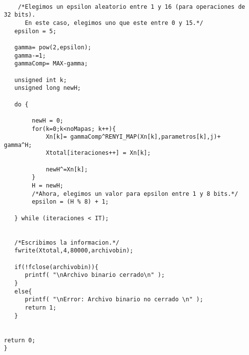 \documentclass[12pt,3p]{elsarticle}
\begin{document}
\begin{verbatim}
 
    /*Elegimos un epsilon aleatorio entre 1 y 16 (para operaciones de 32 bits).
      En este caso, elegimos uno que este entre 0 y 15.*/
   epsilon = 5;   
  
   gamma= pow(2,epsilon);
   gamma-=1;
   gammaComp= MAX-gamma;
    
   unsigned int k;
   unsigned long newH;

   do {
        
        newH = 0;
        for(k=0;k<noMapas; k++){            
            Xn[k]= gammaComp^RENYI_MAP(Xn[k],parametros[k],j)+ gamma^H;
            Xtotal[iteraciones++] = Xn[k];
     
            newH^=Xn[k];      
        }
        H = newH;
        /*Ahora, elegimos un valor para epsilon entre 1 y 8 bits.*/
        epsilon = (H % 8) + 1;  

   } while (iteraciones < IT);
 

   /*Escribimos la informacion.*/
   fwrite(Xtotal,4,80000,archivobin); 

   if(!fclose(archivobin)){
      printf( "\nArchivo binario cerrado\n" );
   }
   else{
      printf( "\nError: Archivo binario no cerrado \n" );
      return 1;
   }  
   

return 0;
}
\end{verbatim}
\end{document}
